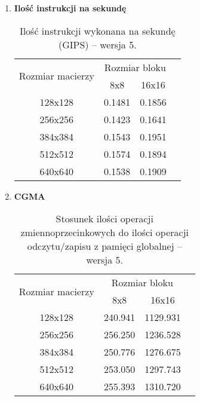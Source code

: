 \begin{enumerate}
\item \textbf{Ilość instrukcji na sekundę} \newline

\begin{table}[H]
\centering
\begin{tabular}{|c|c|c|c|}
\hline
\multirow{2}{*}{Rozmiar macierzy} & \multicolumn{2}{c|}{Rozmiar bloku} \\ \cline{2-3}
& 8x8 & 16x16 \\ \hline
128x128 & 0.1481 & 0.1856 \\ \hline
256x256 & 0.1423 & 0.1641 \\ \hline
384x384 & 0.1543 & 0.1951 \\ \hline
512x512 & 0.1574 & 0.1894 \\ \hline
640x640 & 0.1538 & 0.1909 \\ \hline
\end{tabular}
\caption{Ilość instrukcji wykonana na sekundę (GIPS) -- wersja 5.}
\end{table}

\item \textbf{CGMA} \newline

\begin{table}[H]
\centering
\begin{tabular}{|c|c|c|c|}
\hline
\multirow{2}{*}{Rozmiar macierzy} & \multicolumn{2}{c|}{Rozmiar bloku} \\ \cline{2-3}
& 8x8 & 16x16 \\ \hline
128x128 & 240.941 & 1129.931 \\ \hline
256x256 & 256.250 & 1236.528 \\ \hline
384x384 & 250.776 & 1276.675 \\ \hline
512x512 & 253.050 & 1297.743 \\ \hline
640x640 & 255.393 & 1310.720 \\ \hline
\end{tabular}
\caption{Stosunek ilości operacji zmiennoprzecinkowych do ilości operacji odczytu/zapisu z pamięci globalnej -- wersja 5.}
\end{table}

\end{enumerate}
